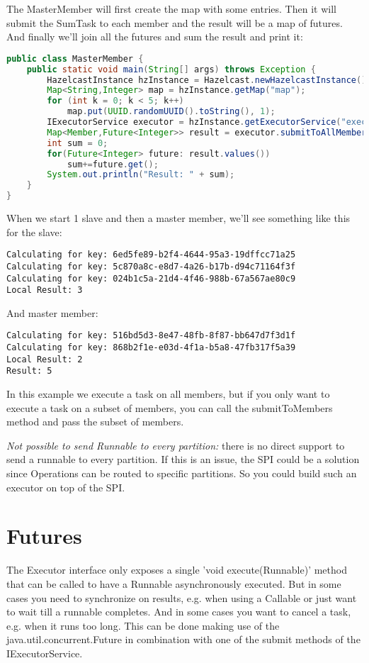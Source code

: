 The MasterMember will first create the map with some entries. Then it will submit the SumTask to each member and the result will be a map of futures. And finally we'll join all the futures and sum the result and print it:
\begin{lstlisting}[language=java]
public class MasterMember {
    public static void main(String[] args) throws Exception {
        HazelcastInstance hzInstance = Hazelcast.newHazelcastInstance();
        Map<String,Integer> map = hzInstance.getMap("map");
        for (int k = 0; k < 5; k++)
            map.put(UUID.randomUUID().toString(), 1);
        IExecutorService executor = hzInstance.getExecutorService("executor");
        Map<Member,Future<Integer>> result = executor.submitToAllMembers (new SumTask());
        int sum = 0;
        for(Future<Integer> future: result.values())
            sum+=future.get();
        System.out.println("Result: " + sum);
    }
}
\end{lstlisting}
When we start 1 slave and then a master member, we'll see something like this for the slave:
\begin{lstlisting}
Calculating for key: 6ed5fe89-b2f4-4644-95a3-19dffcc71a25
Calculating for key: 5c870a8c-e8d7-4a26-b17b-d94c71164f3f
Calculating for key: 024b1c5a-21d4-4f46-988b-67a567ae80c9
Local Result: 3
\end{lstlisting}
And master member:
\begin{lstlisting}
Calculating for key: 516bd5d3-8e47-48fb-8f87-bb647d7f3d1f
Calculating for key: 868b2f1e-e03d-4f1a-b5a8-47fb317f5a39
Local Result: 2
Result: 5
\end{lstlisting}
In this example we execute a task on all members, but if you only want to execute a task on a subset of members, you can call the submitToMembers method and pass the subset of members.

\emph{Not possible to send Runnable to every partition:} there is no direct support to send a runnable to every partition. If this is an issue, the SPI could be a solution since Operations can be routed to specific partitions. So you could build such an executor on top of the SPI.

\section{Futures}
The  Executor interface only exposes a single 'void execute(Runnable)' method that can be called to have a Runnable asynchronously executed. But in some cases you need to synchronize on results, e.g. when using a Callable or just want to wait till a runnable completes. And in some cases you want to cancel a task, e.g. when it runs too long. This can be done making use of the java.util.concurrent.Future in combination with one of the submit methods of the IExecutorService.


